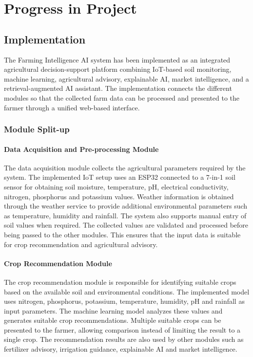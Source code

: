 \chapter{Progress in Project}

\section{Implementation}

The Farming Intelligence AI system has been implemented as an integrated agricultural decision-support platform combining IoT-based soil monitoring, machine learning, agricultural advisory, explainable AI, market intelligence, and a retrieval-augmented AI assistant. The implementation connects the different modules so that the collected farm data can be processed and presented to the farmer through a unified web-based interface.

\subsection{Module Split-up}

\subsubsection{Data Acquisition and Pre-processing Module}

The data acquisition module collects the agricultural parameters required by the system. The implemented IoT setup uses an ESP32 connected to a 7-in-1 soil sensor for obtaining soil moisture, temperature, pH, electrical conductivity, nitrogen, phosphorus and potassium values. Weather information is obtained through the weather service to provide additional environmental parameters such as temperature, humidity and rainfall. The system also supports manual entry of soil values when required. The collected values are validated and processed before being passed to the other modules. This ensures that the input data is suitable for crop recommendation and agricultural advisory.

\subsubsection{Crop Recommendation Module}

The crop recommendation module is responsible for identifying suitable crops based on the available soil and environmental conditions. The implemented model uses nitrogen, phosphorus, potassium, temperature, humidity, pH and rainfall as input parameters. The machine learning model analyzes these values and generates suitable crop recommendations. Multiple suitable crops can be presented to the farmer, allowing comparison instead of limiting the result to a single crop. The recommendation results are also used by other modules such as fertilizer advisory, irrigation guidance, explainable AI and market intelligence.

